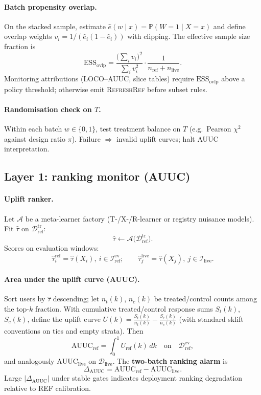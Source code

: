 \paragraph{Batch propensity overlap.}
On the stacked sample, estimate $\hat e(w\mid x)=\mathbb P(W=1\mid X=x)$ and define overlap weights
$v_i = 1/(\hat e_i(1-\hat e_i))$ with clipping.
The effective sample size fraction is
\[
  \mathrm{ESS}_{\mathrm{ovlp}}
  = \frac{\bigl(\sum_i v_i\bigr)^2}{\sum_i v_i^2}\cdot\frac{1}{n_{\mathrm{ref}}+n_{\mathrm{live}}}.
\]
Monitoring attributions (LOCO--AUUC, slice tables) require $\mathrm{ESS}_{\mathrm{ovlp}}$ above a policy threshold; otherwise emit \textsc{RefreshRef} before subset rules.

\paragraph{Randomisation check on $T$.}
Within each batch $w\in\{0,1\}$, test treatment balance on $T$ (e.g.\ Pearson $\chi^2$ against design ratio $\pi$).
Failure $\Rightarrow$ invalid uplift curves; halt AUUC interpretation.

\subsection{Layer 1: ranking monitor (AUUC)}

\paragraph{Uplift ranker.}
Let $\mathcal{A}$ be a meta-learner factory (T-/X-/R-learner or registry nuisance models).
Fit $\hat\tau$ on $\mathcal{D}_{\mathrm{ref}}^{\mathrm{tr}}$:
\[
  \hat\tau \leftarrow \mathcal{A}\bigl(\mathcal{D}_{\mathrm{ref}}^{\mathrm{tr}}\bigr).
\]
Scores on evaluation windows:
\[
  \hat\tau_i^{\mathrm{ref}} = \hat\tau(X_i),\ i\in\mathcal{I}_{\mathrm{ref}}^{\mathrm{ev}};
  \qquad
  \hat\tau_j^{\mathrm{live}} = \hat\tau(X_j),\ j\in\mathcal{I}_{\mathrm{live}}.
\]

\paragraph{Area under the uplift curve (AUUC).}
Sort users by $\hat\tau$ descending; let $n_t(k)$, $n_c(k)$ be treated/control counts among the top-$k$ fraction.
With cumulative treated/control response sums $S_t(k)$, $S_c(k)$, define the uplift curve
$U(k)=\frac{S_t(k)}{n_t(k)}-\frac{S_c(k)}{n_c(k)}$ (with standard sklift conventions on ties and empty strata).
Then
\[
  \mathrm{AUUC}_{\mathrm{ref}}
  = \int_0^1 U_{\mathrm{ref}}(k)\,dk
  \quad\text{on}\quad \mathcal{D}_{\mathrm{ref}}^{\mathrm{ev}},
\]
and analogously $\mathrm{AUUC}_{\mathrm{live}}$ on $\mathcal{D}_{\mathrm{live}}$.
The \textbf{two-batch ranking alarm} is
\[
  \Delta_{\mathrm{AUUC}} = \mathrm{AUUC}_{\mathrm{ref}} - \mathrm{AUUC}_{\mathrm{live}}.
\]
Large $|\Delta_{\mathrm{AUUC}}|$ under stable gates indicates deployment ranking degradation relative to REF calibration.

